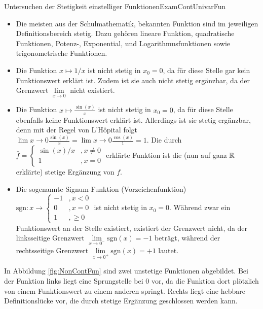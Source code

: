 \begin{example}{Untersuchen der Stetigkeit einstelliger Funktionen}{ExamContUnivarFun}
    \begin{itemize}
        \item Die meisten aus der Schulmathematik, bekannten Funktion sind im jeweiligen Definitionsbereich stetig. Dazu gehören lineare Funktion, quadratische Funktionen, Potenz-, Exponential, und Logarithmusfunktionen sowie trigonometrische Funktionen.
        \item Die Funktion $x\mapsto 1/x$ ist nicht stetig in $x_0=0$, da für diese Stelle gar kein Funktionswert erklärt ist. Zudem ist sie auch nicht stetig ergänzbar, da der Grenzwert $\lim\limits_{x\to 0}$ nicht existiert.
        \item Die Funktion $x \mapsto \frac{\sin(x)}{x}$ ist nicht stetig in $x_0=0$, da für diese Stelle ebenfalls keine Funktionswert erklärt ist. Allerdings ist sie stetig ergänzbar, denn mit der Regel von L'Hôpital folgt $\lim\limits{x\to 0} \frac{\sin(x)}{x} = \lim\limits{x\to 0} \frac{\cos(x)}{1} = 1$. Die durch $\bar{f} = \begin{cases} \sin(x)/x & , x \ne 0 \\ 1 & , x = 0 \end{cases}$ erklärte Funktion ist die (nun auf ganz $\mathbb{R}$ erklärte) stetige Ergänzung von $f$.
        \item Die sogenannte Signum-Funktion (Vorzeichenfunktion) $\text{sgn}: x \to \begin{cases} -1 &, x < 0 \\ 0 &, x = 0 \\ 1 &, \ge 0 \end{cases}$ ist nicht stetig in $x_0=0$. Während zwar ein Funktionswert an der Stelle existiert, existiert der Grenzwert nicht, da der linksseitige Grenzwert $\lim\limits_{x\to 0^-} \text{sgn}(x) = -1$ beträgt, während der rechtsseitige Grenzwert $\lim\limits_{x\to 0^+} \text{sgn}(x) = +1$ lautet.
    \end{itemize}
\end{example}

In Abbildung \ref{fig:NonContFun} sind zwei unstetige Funktionen abgebildet. Bei der Funktion links liegt eine Sprungstelle bei $0$ vor, da die Funktion dort plötzlich von einem Funktionswert zu einem anderen springt. Rechts liegt eine hebbare Definitionslücke vor, die durch stetige Ergänzung geschlossen werden kann.

